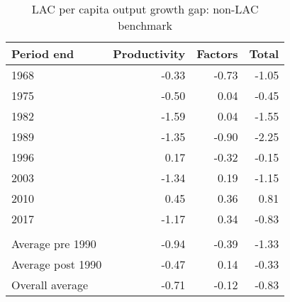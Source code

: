 \begin{table}[!h]

\caption{\label{tab:}LAC per capita output growth gap: non-LAC benchmark}
\centering
\begin{tabular}[t]{lrrr}
\toprule
Period end & Productivity & Factors & Total\\
\midrule
1968 & -0.33 & -0.73 & -1.05\\
1975 & -0.50 & 0.04 & -0.45\\
1982 & -1.59 & 0.04 & -1.55\\
1989 & -1.35 & -0.90 & -2.25\\
1996 & 0.17 & -0.32 & -0.15\\
2003 & -1.34 & 0.19 & -1.15\\
2010 & 0.45 & 0.36 & 0.81\\
2017 & -1.17 & 0.34 & -0.83\\
\addlinespace[0.3em]
\multicolumn{4}{l}{\textbf{Averages}}\\
\hspace{1em}Average pre 1990 & -0.94 & -0.39 & -1.33\\
\hspace{1em}Average post 1990 & -0.47 & 0.14 & -0.33\\
\hspace{1em}Overall average & -0.71 & -0.12 & -0.83\\
\bottomrule
\end{tabular}
\end{table}